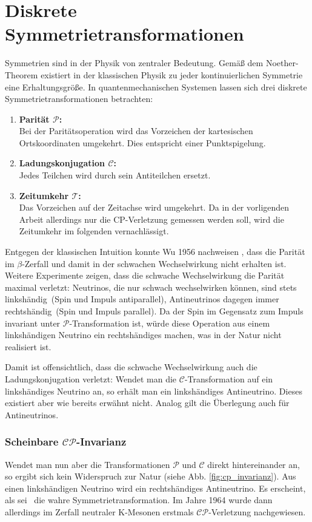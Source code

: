 \section{Diskrete Symmetrietransformationen}
Symmetrien sind in der Physik von zentraler Bedeutung. Gemäß dem Noether-Theorem existiert in der klassischen Physik zu jeder kontinuierlichen Symmetrie eine Erhaltungsgröße. In quantenmechanischen Systemen lassen sich drei diskrete Symmetrietransformationen betrachten:
\begin{enumerate}
\boldmath
\item \textbf{Parität $\mathcal{P}$:} \\
      Bei der Paritätsoperation wird das Vorzeichen der kartesischen Ortskoordinaten umgekehrt. Dies entspricht einer Punktspigelung.
\item \textbf{Ladungskonjugation $\mathcal{C}$:} \\
      Jedes Teilchen wird durch sein Antiteilchen ersetzt.
\item \textbf{Zeitumkehr $\mathcal{T}$:} \\
      Das Vorzeichen auf der Zeitachse wird umgekehrt. Da in der vorligenden Arbeit allerdings nur die CP-Verletzung gemessen werden soll, wird die Zeitumkehr im folgenden vernachlässigt.
\unboldmath
\end{enumerate}
Entgegen der klassischen Intuition konnte Wu 1956 nachweisen \cite{wu-experiment}, dass die Parität im $\beta$-Zerfall und damit in der schwachen Wechselwirkung nicht erhalten ist. Weitere Experimente zeigen, dass die schwache Wechselwirkung die Parität maximal verletzt: Neutrinos, die nur schwach wechselwirken können, sind stets \glqq linkshändig\grqq\ (Spin und Impuls antiparallel), Antineutrinos dagegen immer \glqq rechtshändig\grqq\ (Spin und Impuls parallel). Da der Spin im Gegensatz zum Impuls invariant unter $\mathcal{P}$-Transformation ist, würde diese Operation aus einem linkshändigen Neutrino ein rechtshändiges machen, was in der Natur nicht realisiert ist.

Damit ist offensichtlich, dass die schwache Wechselwirkung auch die Ladungskonjugation verletzt: Wendet man die $\mathcal{C}$-Transformation auf ein linkshändiges Neutrino an, so erhält man ein linkshändiges Antineutrino. Dieses existiert aber wie bereits erwähnt nicht. Analog gilt die Überlegung auch für Antineutrinos.

\subsubsection{Scheinbare \boldmath$\mathcal{CP}$\unboldmath-Invarianz}
Wendet man nun aber die Transformationen $\mathcal{P}$ und $\mathcal{C}$ direkt hintereinander an, so ergibt sich kein Widerspruch zur Natur (siehe Abb. \ref{fig:cp_invarianz}). Aus einen linkshändigen Neutrino wird ein rechtshändiges Antineutrino. Es erscheint, als sei \CP\ die wahre Symmetrietransformation. Im Jahre 1964 wurde dann allerdings im Zerfall neutraler K-Mesonen erstmals $\mathcal{CP}$-Verletzung nachgewiesen. \cite{kleinknecht}

